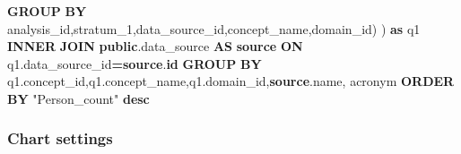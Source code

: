 \documentclass[
]{book}
\newenvironment{Shaded}{\begin{snugshade}}{\end{snugshade}}
\newcommand{\KeywordTok}[1]{\textcolor[rgb]{0.13,0.29,0.53}{\textbf{#1}}}
\newcommand{\NormalTok}[1]{#1}
\newcommand{\OperatorTok}[1]{\textcolor[rgb]{0.81,0.36,0.00}{\textbf{#1}}}
\newcommand{\OtherTok}[1]{\textcolor[rgb]{0.56,0.35,0.01}{#1}}
\begin{document}
\begin{Shaded}
\begin{Highlighting}[]
            \KeywordTok{GROUP} \KeywordTok{BY}\NormalTok{ analysis\_id,stratum\_1,data\_source\_id,concept\_name,domain\_id) ) }\KeywordTok{as}\NormalTok{ q1}
    \KeywordTok{INNER} \KeywordTok{JOIN} \KeywordTok{public}\NormalTok{.data\_source }\KeywordTok{AS} \KeywordTok{source} \KeywordTok{ON}\NormalTok{ q1.data\_source\_id}\OperatorTok{=}\KeywordTok{source}\NormalTok{.}\KeywordTok{id}
\KeywordTok{GROUP} \KeywordTok{BY}\NormalTok{ q1.concept\_id,q1.concept\_name,q1.domain\_id,}\KeywordTok{source}\NormalTok{.name, acronym}
\KeywordTok{ORDER} \KeywordTok{BY} \OtherTok{"Person\_count"} \KeywordTok{desc}
\end{Highlighting}
\end{Shaded}

\hypertarget{chart-settings-24}{%
\subsubsection*{Chart settings}\label{chart-settings-24}}
\end{document}
